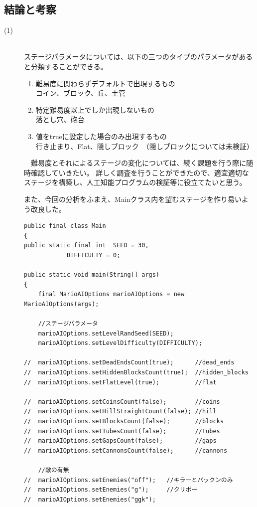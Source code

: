 \documentclass[a4j]{jarticle}
\begin{document}
\subsection{結論と考察}
\begin{description}
\item[(1)]~\\
ステージパラメータについては、以下の三つのタイプのパラメータがあると分類することができる。
\begin{enumerate}
\item 難易度に関わらずデフォルトで出現するもの ~\\
コイン、ブロック、丘、土管
\item 特定難易度以上でしか出現しないもの~\\
落とし穴、砲台
\item 値をtrueに設定した場合のみ出現するもの~\\
行き止まり、Flat、隠しブロック　（隠しブロックについては未検証）
\end{enumerate}

　難易度とそれによるステージの変化については、続く課題を行う際に随時確認していきたい。
詳しく調査を行うことができたので、適宜適切なステージを構築し、人工知能プログラムの検証等に役立てたいと思う。

また、今回の分析をふまえ、Mainクラス内を望むステージを作り易いよう改良した。
\begin{verbatim}
public final class Main
{
public static final int  SEED = 30,
		  	DIFFICULTY = 0;

public static void main(String[] args)
{
    final MarioAIOptions marioAIOptions = new MarioAIOptions(args);
 
    //ステージパラメータ
    marioAIOptions.setLevelRandSeed(SEED);
    marioAIOptions.setLevelDifficulty(DIFFICULTY);

//  marioAIOptions.setDeadEndsCount(true);		//dead_ends
//  marioAIOptions.setHiddenBlocksCount(true);	//hidden_blocks
//  marioAIOptions.setFlatLevel(true);			//flat
   
//  marioAIOptions.setCoinsCount(false);		//coins
//  marioAIOptions.setHillStraightCount(false);	//hill
//  marioAIOptions.setBlocksCount(false);		//blocks
//  marioAIOptions.setTubesCount(false);		//tubes
//  marioAIOptions.setGapsCount(false); 		//gaps
//  marioAIOptions.setCannonsCount(false);		//cannons
    
    //敵の有無  
//  marioAIOptions.setEnemies("off");	//キラーとパックンのみ
//  marioAIOptions.setEnemies("g"); 	//クリボー
//  marioAIOptions.setEnemies("ggk");
    

\end{verbatim}
\end{description}
\end{document}
